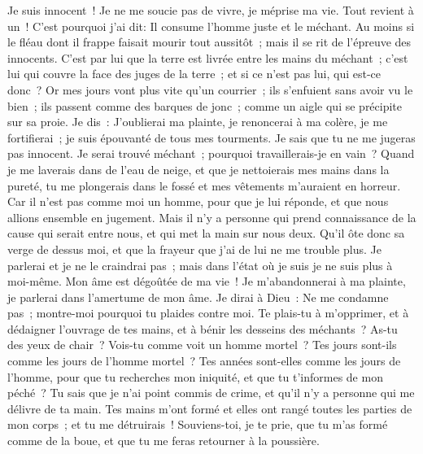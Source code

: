 \begin{multicols}{2}
Je suis innocent~! Je ne me soucie pas de vivre, je méprise ma vie.
Tout revient à un~! C'est pourquoi j'ai dit: Il consume l'homme juste et le méchant.
Au moins si le fléau dont il frappe faisait mourir tout aussitôt~; mais il se rit de l'épreuve des innocents.
C'est par lui que la terre est livrée entre les mains du méchant~; c'est lui qui couvre la face des juges de la terre~; et si ce n'est pas lui, qui est-ce donc~?
Or mes jours vont plus vite qu'un courrier~; ils s'enfuient sans avoir vu le bien~;
ils passent comme des barques de jonc~; comme un aigle qui se précipite sur sa proie.
Je dis~: J'oublierai ma plainte, je renoncerai à ma colère, je me fortifierai~;
je suis épouvanté de tous mes tourments. Je sais que tu ne me jugeras pas innocent.
Je serai trouvé méchant~; pourquoi travaillerais-je en vain~?
Quand je me laverais dans de l'eau de neige, et que je nettoierais mes mains dans la pureté,
tu me plongerais dans le fossé et mes vêtements m'auraient en horreur.
Car il n'est pas comme moi un homme, pour que je lui réponde, et que nous allions ensemble en jugement.
Mais il n'y a personne qui prend connaissance de la cause qui serait entre nous, et qui met la main sur nous deux.
Qu'il ôte donc sa verge de dessus moi, et que la frayeur que j'ai de lui ne me trouble plus.
Je parlerai et je ne le craindrai pas~; mais dans l'état où je suis je ne suis plus à moi-même.
\VerseOne{}Mon âme est dégoûtée de ma vie~! Je m'abandonnerai à ma plainte, je parlerai dans l'amertume de mon âme.
Je dirai à Dieu~: Ne me condamne pas~; montre-moi pourquoi tu plaides contre moi.
Te plais-tu à m'opprimer, et à dédaigner l'ouvrage de tes mains, et à bénir les desseins des méchants~?
As-tu des yeux de chair~? Vois-tu comme voit un homme mortel~?
Tes jours sont-ils comme les jours de l'homme mortel~? Tes années sont-elles comme les jours de l'homme,
pour que tu recherches mon iniquité, et que tu t'informes de mon péché~?
Tu sais que je n'ai point commis de crime, et qu'il n'y a personne qui me délivre de ta main.
Tes mains m'ont formé et elles ont rangé toutes les parties de mon corps~; et tu me détruirais~!
Souviens-toi, je te prie, que tu m'as formé comme de la boue, et que tu me feras retourner à la poussière.

\end{multicols}

